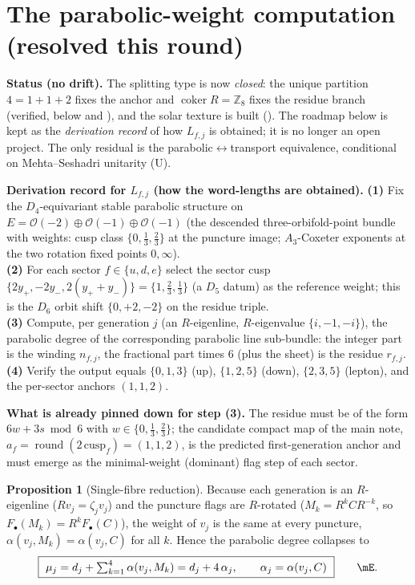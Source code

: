 \documentclass[11pt,a4paper]{article}
\newcommand{\Z}{\mathbb{Z}}
\theoremstyle{definition}
\newtheorem{proposition}{Proposition}
\begin{document}
\section{The parabolic-weight computation (resolved this round)}
\noindent\textbf{Status (no drift).} The splitting type is now \emph{closed}: the unique partition
$4{=}1{+}1{+}2$ fixes the anchor and $\operatorname{coker}R=\Z_8$ fixes the residue branch (verified, below
and ), and the solar texture is built (). The
roadmap below is kept as the \emph{derivation record} of how $L_{f,j}$ is obtained; it is no longer an open
project. The only residual is the parabolic$\leftrightarrow$transport equivalence, conditional on
Mehta--Seshadri unitarity (U).
\par\smallskip\noindent\textbf{Derivation record for $L_{f,j}$ (how the word-lengths are obtained).}
\textbf{(1)} Fix the $D_4$-equivariant stable parabolic structure on
$E=\mathcal O(-2)\oplus\mathcal O(-1)\oplus\mathcal O(-1)$ (the descended three-orbifold-point bundle
with weights: cusp class $\{0,\tfrac13,\tfrac23\}$ at the puncture image; $A_3$-Coxeter exponents at the
two rotation fixed points $0,\infty$).\\
\textbf{(2)} For each sector $f\in\{u,d,e\}$ select the sector cusp
$\{2y_+,-2y_-,2(y_++y_-)\}=\{1,\tfrac23,\tfrac13\}$ (a $D_5$ datum) as the reference weight; this is the
$D_6$ orbit shift $\{0,+2,-2\}$ on the residue triple.\\
\textbf{(3)} Compute, per generation $j$ (an $R$-eigenline, $R$-eigenvalue $\{i,-1,-i\}$), the parabolic
degree of the corresponding parabolic line sub-bundle: the integer part is the winding $n_{f,j}$, the
fractional part times $6$ (plus the sheet) is the residue $r_{f,j}$.\\
\textbf{(4)} Verify the output equals
$\{0,1,3\}$ (up), $\{1,2,5\}$ (down), $\{2,3,5\}$ (lepton), and the per-sector anchors $(1,1,2)$.
\par\smallskip

\noindent\textbf{What is already pinned down for step (3).} The residue must be of the form
$6w+3s\bmod 6$ with $w\in\{0,\tfrac13,\tfrac23\}$; the candidate compact map of the main note,
$a_f=\operatorname{round}(2\,\mathrm{cusp}_f)=(1,1,2)$, is the predicted first-generation anchor and must
emerge as the minimal-weight (dominant) flag step of each sector.

\begin{proposition}[Single-fibre reduction]
Because each generation is an $R$-eigenline ($Rv_j=\zeta_j v_j$) and the puncture flags are $R$-rotated
($M_k=R^kCR^{-k}$, so $F_\bullet(M_k)=R^kF_\bullet(C)$), the weight of $v_j$ is the same at every
puncture, $\alpha(v_j,M_k)=\alpha(v_j,C)$ for all $k$. Hence the parabolic degree collapses to
\begin{equation}
  \boxed{\ \mu_j=d_j+\textstyle\sum_{k=1}^4\alpha(v_j,M_k)=d_j+4\,\alpha_j,\qquad \alpha_j=\alpha(v_j,C)\ }\qquad\mE .
\end{equation}
\end{proposition}
\end{document}
